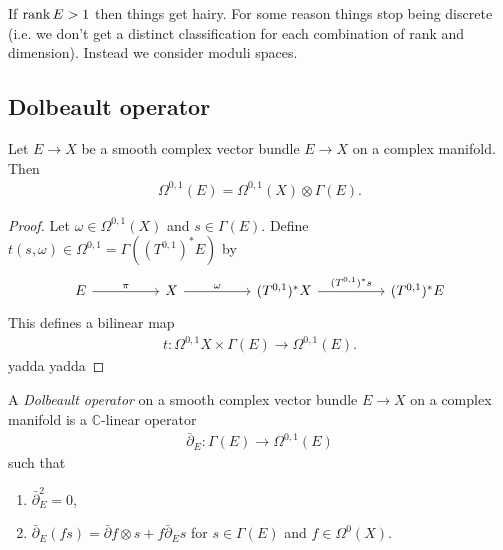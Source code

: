 \documentclass{article}
\begin{document}
If $\operatorname{rank} E>1$ then things get hairy. For some reason 
things stop being discrete (i.e. we don't get a distinct classification
for each combination of rank and dimension). Instead we consider
moduli spaces.

\subsection{Dolbeault operator}

\begin{lemma}
  Let $E\to X$ be a smooth complex vector bundle $E\to X$ on a complex
  manifold. Then
  \begin{align*}
    \Omega^{0,1}(E) = \Omega^{0,1}(X)\otimes\Gamma(E).
  \end{align*}
  \begin{proof}
    Let $\omega\in\Omega^{0,1}(X)$ and $s\in\Gamma(E)$. Define
    $t(s,\omega)\in\Omega^{0,1}=\Gamma({\left({T^{0,1}}\right)^* E})$
    by
    \begin{equation*}
      \begin{tikzcd}
        E && X && {(T^{0,1})^* X} && {(T^{0,1})^*E}
        \arrow["\pi", from=1-1, to=1-3]
        \arrow["\omega", from=1-3, to=1-5]
        \arrow["{(T^{0,1})^* s}", from=1-5, to=1-7]
      \end{tikzcd}
    \end{equation*}
    This defines a bilinear map
    \begin{align*}
      t : \Omega^{0,1} X \times \Gamma(E) \to \Omega^{0,1}(E).
    \end{align*}
    yadda yadda
    \missingproof
  \end{proof}
\end{lemma}

\begin{definition}
  A \emph{Dolbeault operator} on a smooth complex vector bundle
  $E\to X$ on a complex manifold is a $\mathbb{C}$-linear operator
  \begin{align*}
    \bar\partial_E : \Gamma(E) \to \Omega^{0,1}(E)
  \end{align*}
  such that
  \begin{enumerate}
    \item $\bar\partial_E^2 = 0$,
    \item $\bar\partial_E(fs) = \bar\partial f \otimes s + f\bar\partial_E s$
      for $s\in\Gamma(E)$ and $f\in\Omega^0(X)$.
  \end{enumerate}
\end{definition}
\end{document}
